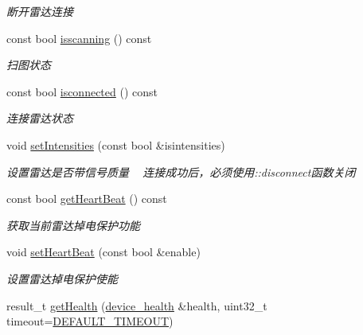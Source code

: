 \begin{DoxyCompactItemize}
\begin{DoxyCompactList}\small\item\em 断开雷达连接 \end{DoxyCompactList}\item 
const bool \hyperlink{classydlidar_1_1_y_dlidar_driver_a37cd2766dec3536848aa25c88d9d1ea9}{isscanning} () const 
\begin{DoxyCompactList}\small\item\em 扫图状态 ~\newline
\end{DoxyCompactList}\item 
const bool \hyperlink{classydlidar_1_1_y_dlidar_driver_a2553d28304faa4acab6bd63e7c6c2ee6}{isconnected} () const 
\begin{DoxyCompactList}\small\item\em 连接雷达状态 ~\newline
\end{DoxyCompactList}\item 
void \hyperlink{classydlidar_1_1_y_dlidar_driver_afc543dbbe1c5e37afc366e3c92203533}{set\+Intensities} (const bool \&isintensities)
\begin{DoxyCompactList}\small\item\em 设置雷达是否带信号质量 ~\newline
连接成功后，必须使用\+::disconnect函数关闭 \end{DoxyCompactList}\item 
const bool \hyperlink{classydlidar_1_1_y_dlidar_driver_a36b01c5124032be12ecbeffeefd38742}{get\+Heart\+Beat} () const 
\begin{DoxyCompactList}\small\item\em 获取当前雷达掉电保护功能 ~\newline
\end{DoxyCompactList}\item 
void \hyperlink{classydlidar_1_1_y_dlidar_driver_af5d6603d3664d3efcb56d64d76d31956}{set\+Heart\+Beat} (const bool \&enable)
\begin{DoxyCompactList}\small\item\em 设置雷达掉电保护使能 ~\newline
\end{DoxyCompactList}\item 
result\+\_\+t \hyperlink{classydlidar_1_1_y_dlidar_driver_a9fe6f8b842a2aff2c3ae13f8423b03f4}{get\+Health} (\hyperlink{structdevice__health}{device\+\_\+health} \&health, uint32\+\_\+t timeout=\hyperlink{classydlidar_1_1_y_dlidar_driver_a13a4f2dc4067b43794b2c47c06d5d27aa07c79ce96f468ff4b40495ef84584442}{D\+E\+F\+A\+U\+L\+T\+\_\+\+T\+I\+M\+E\+O\+UT})

\end{DoxyCompactItemize}
